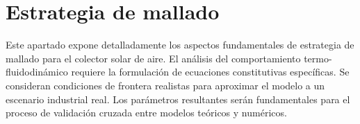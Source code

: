 \section{Estrategia de mallado}
\label{sec:cap07_mallado}

Este apartado expone detalladamente los aspectos fundamentales de estrategia de mallado para el colector solar de aire.
El análisis del comportamiento termo-fluidodinámico requiere la formulación de ecuaciones constitutivas específicas.
Se consideran condiciones de frontera realistas para aproximar el modelo a un escenario industrial real.
Los parámetros resultantes serán fundamentales para el proceso de validación cruzada entre modelos teóricos y numéricos.

